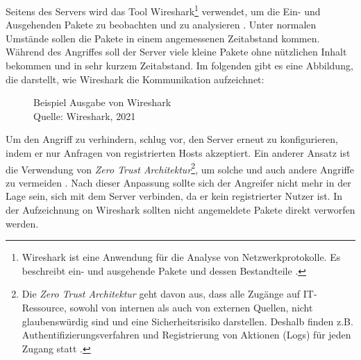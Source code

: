 Seitens des Servers wird das Tool Wireshark\footnote{Wireshark ist eine Anwendung für die Analyse von Netzwerkprotokolle.
Es beschreibt ein- und ausgehende Pakete und dessen Bestandteile \cite{refst:wisa}.} verwendet, um die Ein- und Ausgehenden
Pakete zu beobachten und zu analysieren \cite{refart:UBEC}. Unter normalen Umstände sollen die Pakete in einem angemessenen
Zeitabstand kommen. Während des Angriffes soll der Server viele kleine Pakete ohne nützlichen Inhalt bekommen und in sehr 
kurzem Zeitabstand. Im folgenden gibt es eine Abbildung, die darstellt, wie Wireshark die Kommunikation aufzeichnet:

\begin{figure}[H]
  \caption{Beispiel Ausgabe von Wireshark \\Quelle: Wireshark, 2021}
  \label{fig:refst_wisa}
\end{figure}

Um den Angriff zu verhindern, schlug \cite{refip:NYRS} vor, den Server erneut zu konfigurieren, indem er nur Anfragen von
registrierten Hosts akzeptiert. Ein anderer Ansatz ist die Verwendung von \textit{Zero Trust Architektur}\footnote{Die 
\textit{Zero Trust Architektur} geht davon aus, dass alle Zugänge auf IT-Ressource, sowohl von internen als auch von
externen Quellen, nicht glaubenswürdig sind und eine Sicherheitsrisiko darstellen. Deshalb finden z.B. Authentifizierungsverfahren
und Registrierung von Aktionen (Logs) für jeden Zugang statt \cite{refart:EBZT}.}, um solche und auch andere Angriffe 
zu vermeiden \cite{refip:LYSP}.  Nach dieser Anpassung sollte sich der Angreifer nicht mehr in der Lage sein, sich mit dem Server
verbinden, da er kein registrierter Nutzer ist. In der Aufzeichnung on Wireshark sollten nicht angemeldete Pakete direkt
verworfen werden.


